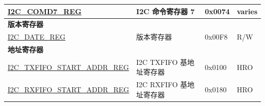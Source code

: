 \begin{longtable}{ | p{6cm} | p{7cm} | p{1.3cm} | p{1cm} | }
\hyperref[regdesc:I2CCOMD7REG]{I2C\_COMD7\_REG} & I2C 命令寄存器 7 & 0x0074 & varies \\ \hline
\multicolumn{4}{|l|}{\textbf{版本寄存器}} \\ \hline
\hyperref[regdesc:I2CDATEREG]{I2C\_DATE\_REG} & 版本寄存器 & 0x00F8 & R/W \\ \hline
\multicolumn{4}{|l|}{\textbf{地址寄存器}} \\ \hline
\hyperref[regdesc:I2CTXFIFOSTARTADDRREG]{I2C\_TXFIFO\_START\_ADDR\_REG} & I2C TXFIFO 基地址寄存器 & 0x0100 & HRO \\ \hline
\hyperref[regdesc:I2CRXFIFOSTARTADDRREG]{I2C\_RXFIFO\_START\_ADDR\_REG} & I2C RXFIFO 基地址寄存器 & 0x0180 & HRO \\ \hline
\end{longtable}
